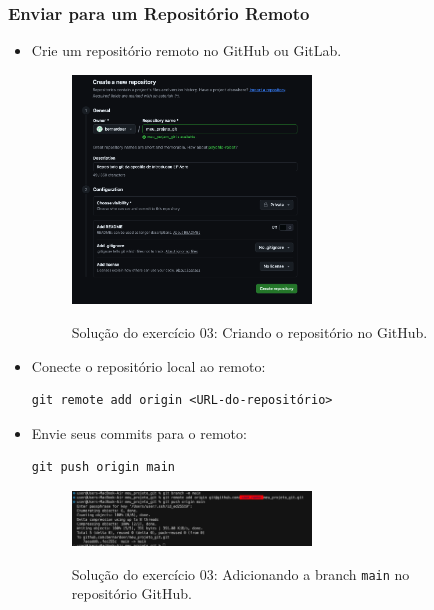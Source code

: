 \subsubsection{Enviar para um Repositório Remoto}
\begin{itemize}
    \item Crie um repositório remoto no GitHub ou GitLab.

    \begin{figure}[H]
        \centering
        \includegraphics[width=0.6\textwidth]{imgs/tutorial_github/ex03_01.png}
        \label{fig:ex03_01}
        \caption{Solução do exercício 03: Criando o repositório no GitHub.}
    \end{figure}
    
    \item Conecte o repositório local ao remoto:
    \begin{lstlisting}[style=shellstyle]
git remote add origin <URL-do-repositório>
    \end{lstlisting}

    
    \item Envie seus commits para o remoto:
    \begin{lstlisting}[style=shellstyle]
git push origin main
    \end{lstlisting}

    \begin{figure}[H]
        \centering
        \includegraphics[width=0.6\textwidth]{imgs/tutorial_github/ex03_03.png}
        \label{fig:ex03_02}
        \caption{Solução do exercício 03: Adicionando a branch \texttt{main} no repositório GitHub.}
    \end{figure}
\end{itemize}


